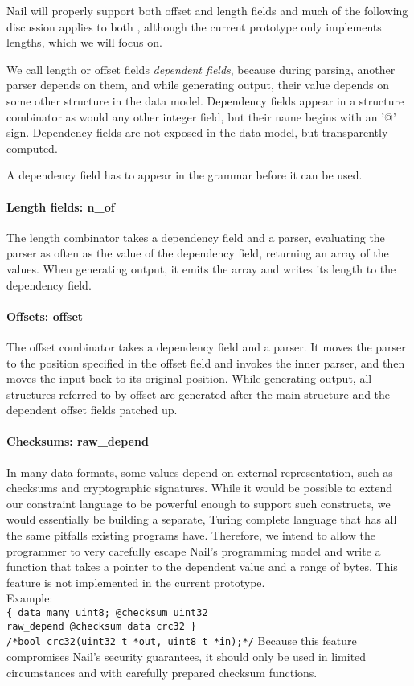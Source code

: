 Nail will properly support both offset and length fields and much of the
following discussion applies to both , although the current prototype only
implements lengths, which we will focus on.

We call length or offset fields \textit{dependent fields}, because during
parsing, another parser depends on them, and while generating output, their
value depends on some other structure in the data model. Dependency fields
appear in a structure combinator as would any other integer field, but their
name begins with an '@' sign. Dependency fields are not exposed in the data
model, but transparently computed.

A dependency field has to appear in the grammar before it can be used. 
\paragraph{Length fields: n_of}
The length combinator takes a dependency field and a parser, evaluating the
parser as often as the value of the dependency field, returning an array of the
values. When generating output, it emits the array and writes its length to the
dependency field.
\paragraph{Offsets: offset} 
The offset combinator takes a dependency field and a parser. It moves the parser
to the position specified in the offset field and invokes the inner parser, and
then moves the input back to its original position.
While generating output, all structures referred to by offset are generated
after the main structure and the dependent offset fields patched up.

\paragraph{Checksums: raw_depend}
In many data formats, some values depend on external representation, such as
checksums and cryptographic signatures. While it would be possible to extend
our constraint language to be powerful enough to support such constructs, we
would essentially be building a separate, Turing complete language that has all
the same pitfalls existing programs have. Therefore, we intend to  allow the programmer to
very carefully escape Nail's programming model and write a function that takes a
pointer to the dependent value and a range of bytes. 
This feature is not implemented in the current prototype. \\
Example:\\
 \verb+{ data many uint8; @checksum uint32+\\
 \verb+raw_depend @checksum data crc32 }+\\
 \verb+/*bool crc32(uint32_t *out, uint8_t *in);*/+
Because this feature compromises Nail's security guarantees, it should only be
used in limited circumstances and with carefully prepared checksum functions. 


